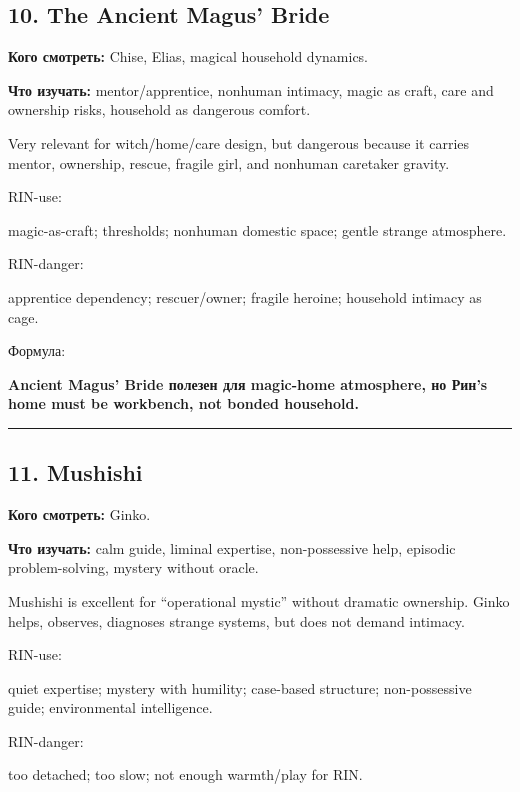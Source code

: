 \subsection*{10. The Ancient Magus' Bride}

\textbf{Кого смотреть:} Chise, Elias, magical household dynamics.

\textbf{Что изучать:} mentor/\hspace{0pt}apprentice, nonhuman intimacy, magic as
craft, care and ownership risks, household as dangerous comfort.

Very relevant for witch/\hspace{0pt}home/\hspace{0pt}care design, but dangerous because it
carries mentor, ownership, rescue, fragile girl, and nonhuman caretaker
gravity.

RIN-use:

magic-as-craft; thresholds; nonhuman domestic space; gentle strange
atmosphere.

RIN-danger:

apprentice dependency; rescuer/\hspace{0pt}owner; fragile heroine; household
intimacy as cage.

Формула:

\textbf{Ancient Magus' Bride полезен для magic-home atmosphere, но Рин's
home must be workbench, not bonded household.}

\begin{center}\rule{0.5\linewidth}{0.5pt}\end{center}

\subsection*{11. Mushishi}

\textbf{Кого смотреть:} Ginko.

\textbf{Что изучать:} calm guide, liminal expertise, non-possessive
help, episodic problem-solving, mystery without oracle.

Mushishi is excellent for ``operational mystic'' without dramatic
ownership. Ginko helps, observes, diagnoses strange systems, but does
not demand intimacy.

RIN-use:

quiet expertise; mystery with humility; case-based structure;
non-possessive guide; environmental intelligence.

RIN-danger:

too detached; too slow; not enough warmth/\hspace{0pt}play for RIN.

